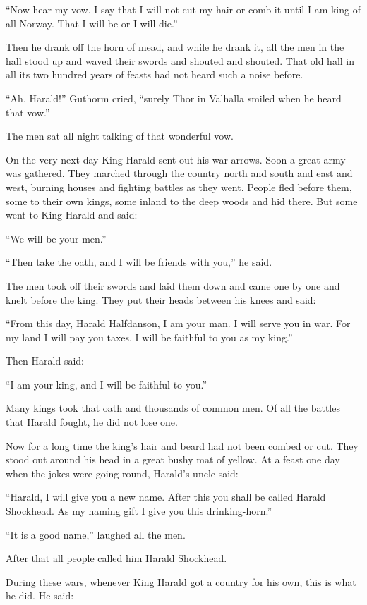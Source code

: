 ``Now hear my vow. I say that I will not cut my hair or comb it until I
am king of all Norway. That I will be or I will die.''

Then he drank off the horn of mead, and while he drank it, all the men
in the hall stood up and waved their swords and shouted and shouted.
That old hall in all its two hundred years of feasts had not heard such
a noise before.

``Ah, Harald!'' Guthorm cried, ``surely Thor in Valhalla smiled when he
heard that vow.''

The men sat all night talking of that wonderful vow.

On the very next day King Harald sent out his war-arrows. Soon a great
army was gathered. They marched through the country north and south and
east and west, burning houses and fighting battles as they went. People
fled before them, some to their own kings, some inland to the deep woods
and hid there. But some went to King Harald and said:

``We will be your men.''

``Then take the oath, and I will be friends with you,'' he said.

The men took off their swords and laid them down and came one by one and
knelt before the king. They put their heads between his knees and said:

``From this day, Harald Halfdanson, I am your man. I will serve you in
war. For my land I will pay you taxes. I will be faithful to you as my
king.''

Then Harald said:

``I am your king, and I will be faithful to you.''

Many kings took that oath and thousands of common men. Of all the
battles that Harald fought, he did not lose one.

Now for a long time the king's hair and beard had not been combed or
cut. They stood out around his head in a great bushy mat of yellow. At a
feast one day when the jokes were going round, Harald's uncle said:

``Harald, I will give you a new name. After this you shall be called
Harald Shockhead. As my naming gift I give you this drinking-horn.''

``It is a good name,'' laughed all the men.

After that all people called him Harald Shockhead.

During these wars, whenever King Harald got a country for his own, this
is what he did. He said:

